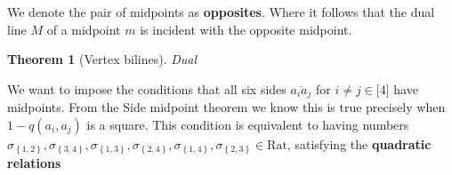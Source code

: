 \documentclass{unswthesis}
\newtheorem{theorem}{Theorem}
\begin{document}
We denote the pair of midpoints as \textbf{opposites}. Where it follows that
the dual line $M$ of a midpoint $m$ is incident with the opposite midpoint.

\begin{theorem}[Vertex bilines]
Dual
\end{theorem}

We want to impose the conditions that all six sides $\overline{a_{i}a_{j}}$
for $i\neq j\in \lbrack 4]$ have midpoints. From the Side midpoint theorem
we know this is true precisely when $1-q(a_{i},a_{j})$ is a square. This
condition is equivalent to having numbers $\sigma _{\left\{ 1,2\right\}
},\sigma _{\left\{ 3,4\right\} },\sigma _{\left\{ 1,3\right\} },\sigma
_{\left\{ 2,4\right\} },\sigma _{\left\{ 1,4\right\} },\sigma _{\left\{
2,3\right\} }\in \text{Rat}$, satisfying the \textbf{quadratic relations}
\end{document}
